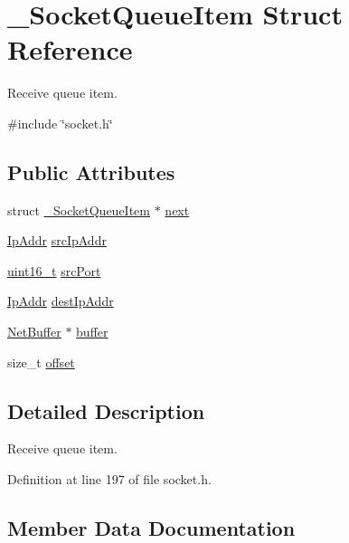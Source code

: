 \hypertarget{struct__SocketQueueItem}{}\section{\+\_\+\+Socket\+Queue\+Item Struct Reference}
\label{struct__SocketQueueItem}


Receive queue item.  




{\ttfamily \#include \char`\"{}socket.\+h\char`\"{}}

\subsection*{Public Attributes}
\begin{DoxyCompactItemize}
\item 
struct \hyperlink{struct__SocketQueueItem}{\+\_\+\+Socket\+Queue\+Item} $\ast$ \hyperlink{struct__SocketQueueItem_a1160810dc2a18cd5fe63d9fc9dbf5f26}{next}
\item 
\hyperlink{structIpAddr}{Ip\+Addr} \hyperlink{struct__SocketQueueItem_a35f1157ded7017ef108d8875d2cedfa7}{src\+Ip\+Addr}
\item 
\hyperlink{stdint_8h_a273cf69d639a59973b6019625df33e30}{uint16\+\_\+t} \hyperlink{struct__SocketQueueItem_aae5da9b297543edc1b28914115ee928b}{src\+Port}
\item 
\hyperlink{structIpAddr}{Ip\+Addr} \hyperlink{struct__SocketQueueItem_a208025c884c682cf54c95b0d12f76962}{dest\+Ip\+Addr}
\item 
\hyperlink{structNetBuffer}{Net\+Buffer} $\ast$ \hyperlink{struct__SocketQueueItem_a31b5c1ca345095021d7af269deefdb42}{buffer}
\item 
size\+\_\+t \hyperlink{struct__SocketQueueItem_a059508c5f38241e226e5d713c0fa98a1}{offset}
\end{DoxyCompactItemize}


\subsection{Detailed Description}
Receive queue item. 

Definition at line 197 of file socket.\+h.



\subsection{Member Data Documentation}
\mbox{\label{struct__SocketQueueItem_a31b5c1ca345095021d7af269deefdb42}} 

